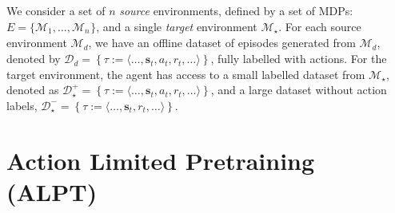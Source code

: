 \documentclass{article} %
\newcommand{\ofir}[1]{{\color{blue} Ofir: #1}}
\begin{document}
We consider a set of $n$ \emph{source} environments, defined by a set of MDPs: $E =\{\mathcal{M}_1,\dots,\mathcal{M}_{n_{}}\}$, and a single \emph{target} environment $\mathcal{M}_\star$. 
For each source environment $\mathcal{M}_d$, we have an offline dataset of episodes generated from $\mathcal{M}_d$, denoted by $\mathcal{D}_d = \left\{\tau:=\langle \dots,\mathbf{s}_t, a_t, r_t, \dots \rangle\right\}$, fully labelled with actions. %
For the target environment, the agent has access to a small labelled dataset from $\mathcal{M}_\star$, denoted as $\mathcal{D}^+_\star = \left\{\tau:=\langle \dots,\mathbf{s}_t, a_t, r_t, \dots \rangle \right\}$, and a large  dataset without action labels, $\mathcal{D}^-_\star = \left\{\tau:=\langle \dots,\mathbf{s}_t, r_t, \dots \rangle \right\}$.  %



\section{Action Limited Pretraining (ALPT)}
\end{document}
